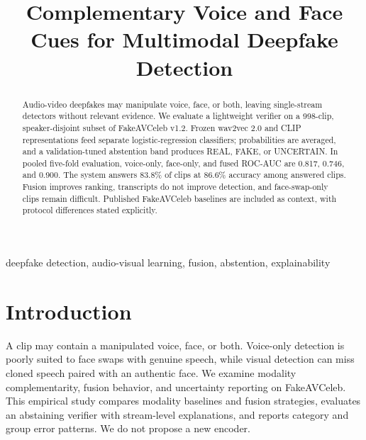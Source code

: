 \documentclass[conference]{IEEEtran}
\title{Complementary Voice and Face Cues for Multimodal Deepfake Detection}
\author{\IEEEauthorblockN{Aryavart Singh Payal}\IEEEauthorblockA{CSET 346: Natural Language Processing\\Project PJ\_07}}
\begin{document}
\maketitle
\begin{abstract}
Audio-video deepfakes may manipulate voice, face, or both, leaving single-stream detectors without relevant evidence. We evaluate a lightweight verifier on a 998-clip, speaker-disjoint subset of FakeAVCeleb v1.2. Frozen wav2vec 2.0 and CLIP representations feed separate logistic-regression classifiers; probabilities are averaged, and a validation-tuned abstention band produces REAL, FAKE, or UNCERTAIN. In pooled five-fold evaluation, voice-only, face-only, and fused ROC-AUC are 0.817, 0.746, and 0.900. The system answers 83.8\% of clips at 86.6\% accuracy among answered clips. Fusion improves ranking, transcripts do not improve detection, and face-swap-only clips remain difficult. Published FakeAVCeleb baselines are included as context, with protocol differences stated explicitly.
\end{abstract}
\begin{IEEEkeywords}deepfake detection, audio-visual learning, fusion, abstention, explainability\end{IEEEkeywords}
\section{Introduction}
A clip may contain a manipulated voice, face, or both. Voice-only detection is poorly suited to face swaps with genuine speech, while visual detection can miss cloned speech paired with an authentic face. We examine modality complementarity, fusion behavior, and uncertainty reporting on FakeAVCeleb. This empirical study compares modality baselines and fusion strategies, evaluates an abstaining verifier with stream-level explanations, and reports category and group error patterns. We do not propose a new encoder.
\end{document}
